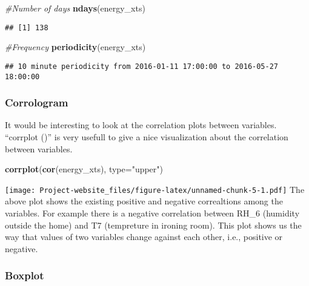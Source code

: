 \documentclass[]{article}
\newenvironment{Shaded}{\begin{snugshade}}{\end{snugshade}}
\newcommand{\KeywordTok}[1]{\textcolor[rgb]{0.13,0.29,0.53}{\textbf{#1}}}
\newcommand{\DataTypeTok}[1]{\textcolor[rgb]{0.13,0.29,0.53}{#1}}
\newcommand{\StringTok}[1]{\textcolor[rgb]{0.31,0.60,0.02}{#1}}
\newcommand{\CommentTok}[1]{\textcolor[rgb]{0.56,0.35,0.01}{\textit{#1}}}
\newcommand{\NormalTok}[1]{#1}
\begin{document}
\begin{Shaded}
\begin{Highlighting}[]
\CommentTok{#Number of days}
\KeywordTok{ndays}\NormalTok{(energy_xts)}
\end{Highlighting}
\end{Shaded}

\begin{verbatim}
## [1] 138
\end{verbatim}

\begin{Shaded}
\begin{Highlighting}[]
\CommentTok{#Frequency}
\KeywordTok{periodicity}\NormalTok{(energy_xts)}
\end{Highlighting}
\end{Shaded}

\begin{verbatim}
## 10 minute periodicity from 2016-01-11 17:00:00 to 2016-05-27 18:00:00
\end{verbatim}

\subsubsection{Corrologram}\label{corrologram}

It would be interesting to look at the correlation plots between
variables. ``corrplot ()'' is very usefull to give a nice visualization
about the correlation between variables.

\begin{Shaded}
\begin{Highlighting}[]
\KeywordTok{corrplot}\NormalTok{(}\KeywordTok{cor}\NormalTok{(energy_xts), }\DataTypeTok{type=}\StringTok{"upper"}\NormalTok{)}
\end{Highlighting}
\end{Shaded}

\texttt{[image: Project-website\_files/figure-latex/unnamed-chunk-5-1.pdf]}
The above plot shows the existing positive and negative correaltions
among the variables. For example there is a negative correlation between
RH\_6 (humidity outside the home) and T7 (tempreture in ironing room).
This plot shows us the way that values of two variables change against
each other, i.e., positive or negative.

\subsubsection{Boxplot}\label{boxplot}
\end{document}
